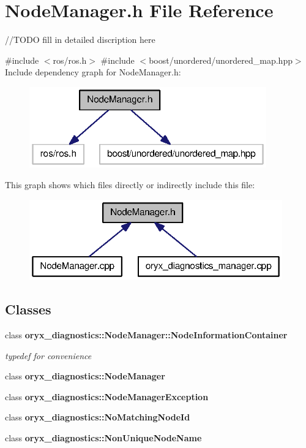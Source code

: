\section{\-Node\-Manager.\-h \-File \-Reference}
\label{NodeManager_8h}


//\-T\-O\-D\-O fill in detailed discription here  


{\ttfamily \#include $<$ros/ros.\-h$>$}\*
{\ttfamily \#include $<$boost/unordered/unordered\-\_\-map.\-hpp$>$}\*
\-Include dependency graph for \-Node\-Manager.\-h\-:
\nopagebreak
\begin{figure}[H]
\begin{center}
\leavevmode
\includegraphics[width=290pt]{NodeManager_8h__incl}
\end{center}
\end{figure}
\-This graph shows which files directly or indirectly include this file\-:
\nopagebreak
\begin{figure}[H]
\begin{center}
\leavevmode
\includegraphics[width=310pt]{NodeManager_8h__dep__incl}
\end{center}
\end{figure}
\subsection*{\-Classes}
\begin{DoxyCompactItemize}
\item 
class {\bf oryx\-\_\-diagnostics\-::\-Node\-Manager\-::\-Node\-Information\-Container}
\begin{DoxyCompactList}\small\item\em typedef for convenience \end{DoxyCompactList}\item 
class {\bf oryx\-\_\-diagnostics\-::\-Node\-Manager}
\item 
class {\bf oryx\-\_\-diagnostics\-::\-Node\-Manager\-Exception}
\item 
class {\bf oryx\-\_\-diagnostics\-::\-No\-Matching\-Node\-Id}
\item 
class {\bf oryx\-\_\-diagnostics\-::\-Non\-Unique\-Node\-Name}
\end{DoxyCompactItemize}

